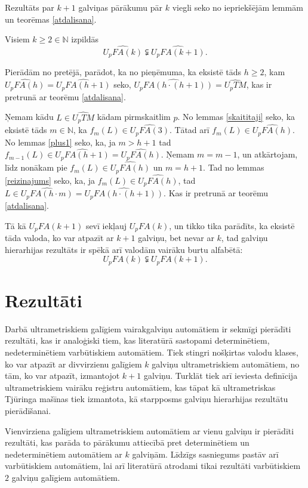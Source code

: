 \documentclass{ludis}
\begin{document}
Rezultāts par $k + 1$ galviņas pārākumu pār $k$ viegli seko no iepriekšējām lemmām un teorēmas \ref{atdalisana}.
\begin{teorema}
Visiem $k \geq 2 \in \mathbb{N}$ izpildās
\[
	\widehat{U_pFA(k)} \subsetneqq \widehat{U_pFA(k + 1)}.
\]
\end{teorema}
\begin{pieradijums}
Pierādām no pretējā, parādot, ka no pieņēmuma, ka eksistē tāds $h \geq 2$, kam $\widehat{U_pFA(h)} = \widehat{U_pFA(h + 1)}$ seko, $\widehat{U_pFA(h \cdot (h + 1))} = \widehat{U_pTM}$, kas ir pretrunā ar teorēmu \ref{atdalisana}.

Ņemam kādu $L \in \widehat{U_pTM}$ kādam pirmskaitlim $p$. No lemmas \ref{skaititaji} seko, ka eksistē tāds $m \in \mathbb{N}$, ka $f_m(L) \in \widehat{U_pFA(3)}$. Tātad arī $f_m(L) \in \widehat{U_pFA(h)}$. No lemmas \ref{plus1} seko, ka, ja $m > h + 1$ tad $f_{m-1}(L) \in \widehat{U_pFA(h + 1)} = \widehat{U_pFA(h)}$. Ņemam $m = m - 1$, un atkārtojam, līdz nonākam pie $f_m(L) \in \widehat{U_pFA(h)}$ un $m = h + 1$. Tad no lemmas \ref{reizinajums} seko, ka, ja $f_m(L) \in \widehat{U_pFA(h)}$, tad $L \in \widehat{U_pFA(h \cdot m)} = \widehat{U_pFA(h \cdot (h + 1))}$. Kas ir pretrunā ar teorēmu \ref{atdalisana}.
\end{pieradijums}
\begin{sekas}
Tā kā $U_pFA(k + 1)$ sevī iekļauj $U_pFA(k)$, un tikko tika parādīts, ka eksistē tāda valoda, ko var atpazīt ar $k+1$ galviņu, bet nevar ar $k$, tad galviņu hierarhijas rezultāts ir spēkā arī valodām vairāku burtu alfabētā:
\[
	U_pFA(k) \subsetneqq U_pFA(k + 1).
\]
\end{sekas}

\chapter{Rezultāti}
Darbā ultrametriskiem galīgiem vairakgalviņu automātiem ir sekmīgi pierādīti rezultāti, kas ir analoģiski tiem, kas literatūrā sastopami determinētiem, nedeterminētiem varbūtiskiem automātiem. Tiek stingri nošķirtas valodu klases, ko var atpazīt ar divvirzienu galīgiem $k$ galviņu ultrametriskiem automātiem, no tām, ko var atpazīt, izmantojot $k+1$ galviņu. Turklāt tiek arī ieviesta definīcija ultrametriskiem vairāku reģistru automātiem, kas tāpat kā ultrametriskas Tjūringa mašīnas tiek izmantota, kā starpposms galviņu hierarhijas rezultātu pierādīšanai.

Vienvirziena galīgiem ultrametriskiem automātiem ar vienu galviņu ir pierādīti rezultāti, kas parāda to pārākumu attiecībā pret determinētiem un nedeterminētiem automātiem ar $k$ galviņām. Līdzīgs sasniegums pastāv arī varbūtiskiem automātiem, lai arī literatūrā atrodami tikai rezultāti varbūtiskiem $2$ galviņu galīgiem automātiem.
\end{document}
